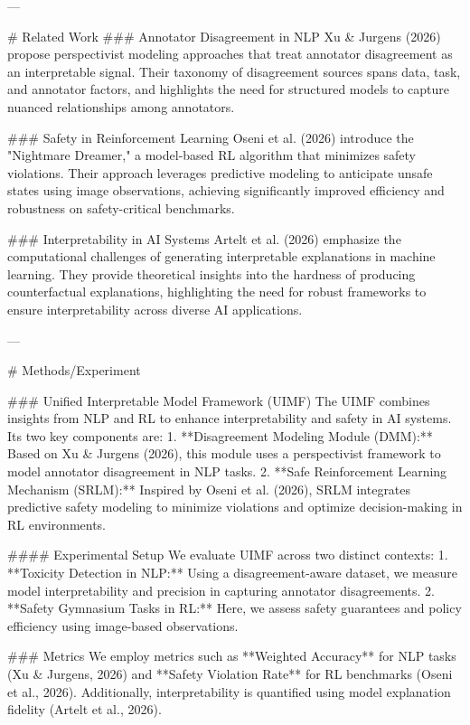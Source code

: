 ---

# Related Work  
### Annotator Disagreement in NLP  
Xu & Jurgens (2026) propose perspectivist modeling approaches that treat annotator disagreement as an interpretable signal. Their taxonomy of disagreement sources spans data, task, and annotator factors, and highlights the need for structured models to capture nuanced relationships among annotators.

### Safety in Reinforcement Learning  
Oseni et al. (2026) introduce the "Nightmare Dreamer," a model-based RL algorithm that minimizes safety violations. Their approach leverages predictive modeling to anticipate unsafe states using image observations, achieving significantly improved efficiency and robustness on safety-critical benchmarks.

### Interpretability in AI Systems  
Artelt et al. (2026) emphasize the computational challenges of generating interpretable explanations in machine learning. They provide theoretical insights into the hardness of producing counterfactual explanations, highlighting the need for robust frameworks to ensure interpretability across diverse AI applications.

---

# Methods/Experiment  

### Unified Interpretable Model Framework (UIMF)  
The UIMF combines insights from NLP and RL to enhance interpretability and safety in AI systems. Its two key components are:  
1. **Disagreement Modeling Module (DMM):** Based on Xu & Jurgens (2026), this module uses a perspectivist framework to model annotator disagreement in NLP tasks.  
2. **Safe Reinforcement Learning Mechanism (SRLM):** Inspired by Oseni et al. (2026), SRLM integrates predictive safety modeling to minimize violations and optimize decision-making in RL environments.

#### Experimental Setup  
We evaluate UIMF across two distinct contexts:  
1. **Toxicity Detection in NLP:** Using a disagreement-aware dataset, we measure model interpretability and precision in capturing annotator disagreements.  
2. **Safety Gymnasium Tasks in RL:** Here, we assess safety guarantees and policy efficiency using image-based observations.  

### Metrics  
We employ metrics such as **Weighted Accuracy** for NLP tasks (Xu & Jurgens, 2026) and **Safety Violation Rate** for RL benchmarks (Oseni et al., 2026). Additionally, interpretability is quantified using model explanation fidelity (Artelt et al., 2026).

